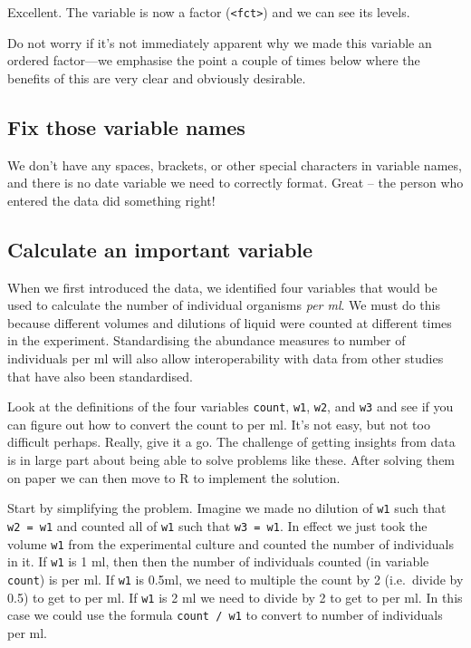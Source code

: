 \documentclass[]{book}
\begin{document}
Excellent. The variable is now a factor (\texttt{\textless{}fct\textgreater{}}) and we can see its levels.

\begin{info}
Do not worry if it's not immediately apparent why we made this variable
an ordered factor---we emphasise the point a couple of times below where
the benefits of this are very clear and obviously desirable.
\end{info}

\hypertarget{fix-those-variable-names}{%
\subsection{Fix those variable names}\label{fix-those-variable-names}}

We don't have any spaces, brackets, or other special characters in variable names, and there is no date variable we need to correctly format. Great -- the person who entered the data did something right!

\hypertarget{calculate-an-important-variable}{%
\subsection{Calculate an important variable}\label{calculate-an-important-variable}}

When we first introduced the data, we identified four variables that would be used to calculate the number of individual organisms \emph{per ml}. We must do this because different volumes and dilutions of liquid were counted at different times in the experiment. Standardising the abundance measures to number of individuals per ml will also allow interoperability with data from other studies that have also been standardised.

Look at the definitions of the four variables \texttt{count}, \texttt{w1}, \texttt{w2}, and \texttt{w3} and see if you can figure out how to convert the count to per ml. It's not easy, but not too difficult perhaps. Really, give it a go. The challenge of getting insights from data is in large part about being able to solve problems like these. After solving them on paper we can then move to R to implement the solution.

Start by simplifying the problem. Imagine we made no dilution of \texttt{w1} such that \texttt{w2\ =\ w1} and counted all of \texttt{w1} such that \texttt{w3\ =\ w1}. In effect we just took the volume \texttt{w1} from the experimental culture and counted the number of individuals in it. If \texttt{w1} is 1 ml, then then the number of individuals counted (in variable \texttt{count}) is per ml. If \texttt{w1} is 0.5ml, we need to multiple the count by 2 (i.e.~divide by 0.5) to get to per ml. If \texttt{w1} is 2 ml we need to divide by 2 to get to per ml. In this case we could use the formula \texttt{count\ /\ w1} to convert to number of individuals per ml.
\end{document}
